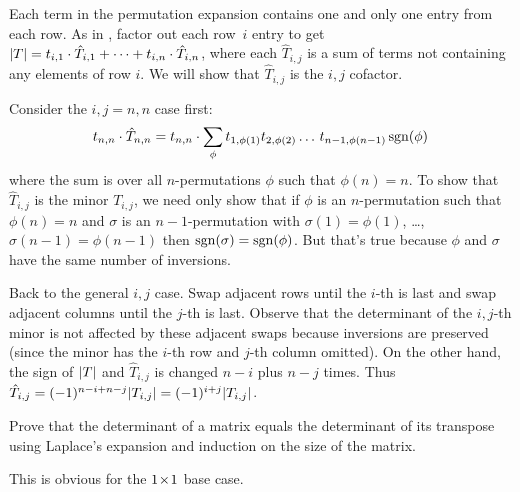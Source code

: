 \begin{exercises}
\begin{answer}
      Each term in the permutation expansion contains one and
      only one entry from each row.
      As in ,
      factor out each row~$i$ entry to get
      \( \deter{T}
           =t_{i,1}\cdot\hat{T}_{i,1}+\dots+t_{i,n}\cdot\hat{T}_{i,n} \),
      where each \( \hat{T}_{i,j} \) is a sum of terms not containing any
      elements of row \( i \).
      We will show that \( \hat{T}_{i,j} \) is the \( i,j \) cofactor.

      Consider the \( i,j=n,n \) case first:
      \begin{equation*}
        t_{n,n}\cdot\hat{T}_{n,n}
        =t_{n,n}\cdot
            \sum_{\phi}t_{1,\phi(1)}t_{2,\phi(2)}\dots\,t_{n-1,\phi(n-1)}
                      \operatorname{sgn}(\phi)
      \end{equation*}
      where the sum is over all \( n \)-permutations \( \phi \) such that
      \( \phi(n)=n \).
      To show that 
      \( \hat{T}_{i,j} \) is the minor \( T_{i,j} \), we need only show
      that if \( \phi \) is an \( n \)-permutation such that 
      \( \phi(n)=n \) and
      \( \sigma \) is an \( n-1 \)-permutation with
      \( \sigma(1)=\phi(1) \), \ldots, \( \sigma(n-1)=\phi(n-1) \)
      then \( \operatorname{sgn}(\sigma)=\operatorname{sgn}(\phi) \).
      But that's true because $\phi$ and $\sigma$ 
      have the same number of inversions.

      Back to the general \( i,j \) case.
      Swap adjacent rows until the \( i \)-th is last and swap adjacent
      columns until the \( j \)-th is last.
      Observe that the determinant of the \( i,j \)-th minor is not affected by
      these adjacent
      swaps because inversions are preserved (since the minor has the
      \( i \)-th row and \( j \)-th column omitted).
      On the other hand, the sign of \( \deter{T} \) and \( \hat{T}_{i,j} \)
      is changed \( n-i \) plus \( n-j \) times.
      Thus \( \hat{T}_{i,j}=(-1)^{n-i+n-j}\deter{T_{i,j}}
                =(-1)^{i+j}\deter{T_{i,j}} \).  
    \end{answer}
  \item 
    Prove that the determinant of a matrix equals the determinant of its
    transpose using Laplace's expansion and induction on the size 
    of the matrix.
    \begin{answer}
      This is obvious for the \( 1 \! \times \! 1 \) base case.


\end{answer}
\end{exercises}

